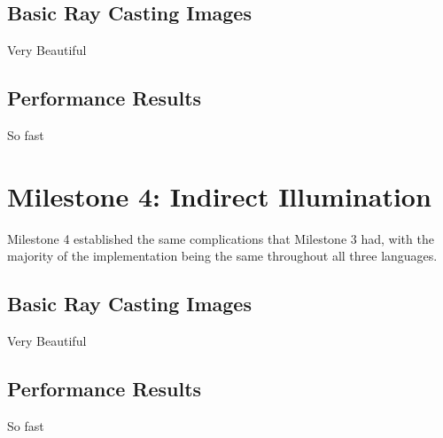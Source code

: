 \subsection{Basic Ray Casting Images}
Very Beautiful
\subsection{Performance Results}
So fast

\section{Milestone 4: Indirect Illumination}
Milestone 4 established the same complications that Milestone 3 had, with the majority of the implementation being the same throughout all three languages.
\subsection{Basic Ray Casting Images}
Very Beautiful
\subsection{Performance Results}
So fast

